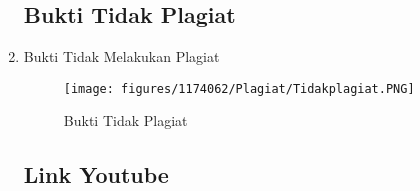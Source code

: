 \begin{enumerate}
\subsection{Bukti Tidak Plagiat}

\item Bukti Tidak Melakukan Plagiat
\begin{figure}[H]
\texttt{[image: figures/1174062/Plagiat/Tidakplagiat.PNG]}
	\centering
	\caption{Bukti Tidak Plagiat }
\end{figure}

\subsection{Link Youtube}

\end{enumerate}
